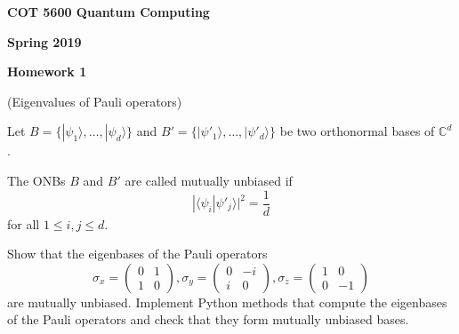 \documentclass[12pt]{article}
\renewcommand{\>}{\rangle}
\newcommand{\<}{\langle}
\newcommand{\C}{\mathbb{C}}
\begin{document}
\begin{center}
{\bf COT 5600 Quantum Computing} 

\medskip
{\bf Spring 2019}

\bigskip

{\bf Homework 1}
\end{center}

\newpage


 (Eigenvalues of Pauli operators)

\medskip
\noindent
Let $B=\{|\psi_1\>,\ldots,|\psi_d\>\}$ and $B'=\{|\psi'_1\>,\ldots,|\psi'_d\>\}$ be two orthonormal bases of $\C^d$. 

The ONBs $B$ and $B'$ are called mutually unbiased if 
\[
|\< \psi_i | \psi'_j \>|^2 = \frac{1}{d} 
\]
for all $1\le i,j \le d$.

Show that the eigenbases of the Pauli operators 
\[
\sigma_x = 
\left(
\begin{array}{cc}
0 & 1 \\
1 & 0
\end{array}
\right),
%
\sigma_y = 
\left(
\begin{array}{cc}
0 & -i \\
i & 0
\end{array}
\right),
%
\sigma_z = 
\left(
\begin{array}{cc}
1 & 0 \\
0 & -1
\end{array}
\right)
\]
are mutually unbiased. Implement Python methods that compute the eigenbases of the Pauli operators and check that they form mutually unbiased bases. \newline
\end{document}
